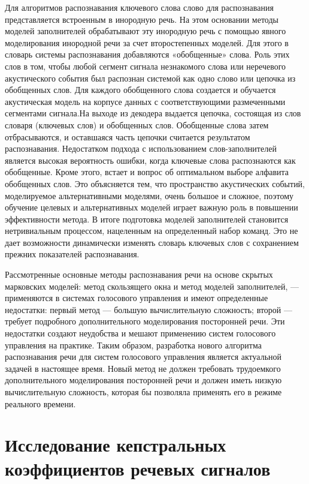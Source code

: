 \documentclass[a4paper,14pt,russian,utf8,nocolumnsxix,nocolumnxxxi,nocolumnxxxii]{eskdtext}
\begin{document}
Для алгоритмов распознавания ключевого слова слово для распознавания представляется встроенным в инородную речь. На этом основании методы моделей заполнителей \cite{higgins} обрабатывают эту инородную речь с помощью явного моделирования инородной речи за счет второстепенных моделей. Для этого в словарь системы распознавания добавляются «обобщенные» слова. Роль этих слов в том, чтобы любой сегмент сигнала незнакомого слова или неречевого акустического события был распознан системой как одно слово или цепочка
из обобщенных слов. Для каждого обобщенного слова создается и обучается акустическая модель на корпусе данных с соответствующими размеченными сегментами сигнала.На выходе из декодера выдается цепочка, состоящая из слов словаря (ключевых слов) и обобщенных слов. Обобщенные слова затем отбрасываются, и оставшаяся часть цепочки считается результатом распознавания.
Недостатком подхода с использованием слов-заполнителей является высокая вероятность ошибки, когда ключевые слова распознаются как обобщенные. Кроме этого, встает и вопрос об оптимальном выборе алфавита обобщенных слов. Это объясняется тем, что пространство акустических событий, моделируемое альтернативными моделями, очень большое и сложное, поэтому обучение целевых и альтернативных моделей играет важную роль в повышении эффективности метода. В итоге подготовка моделей заполнителей становится нетривиальным процессом, нацеленным на определенный набор команд. Это не дает возможности динамически изменять словарь ключевых слов с сохранением прежних показателей распознавания.\cite{grebnov}

Рассмотренные основные методы распознавания речи на основе скрытых марковских моделей: метод скользящего окна и метод
моделей заполнителей, --- применяются в системах голосового управления и имеют определенные недостатки: первый метод --- большую
вычислительную сложность; второй --- требует подробного дополнительного моделирования посторонней речи. Эти недостатки создают неудобства и мешают применению систем голосового управления на практике. Таким образом, разработка нового алгоритма распознавания речи для систем голосового управления является актуальной задачей в настоящее время. Новый метод не должен требовать трудоемкого дополнительного моделирования посторонней речи и должен иметь низкую вычислительную сложность, которая бы позволяла применять его в режиме реального времени.

\pagebreak

\section[Исследование кепстральных коэффициентов речевых сигналов]{Исследование кепстральных\\ коэффициентов речевых сигналов}
\setcounter{figure}{0} 
\end{document}
